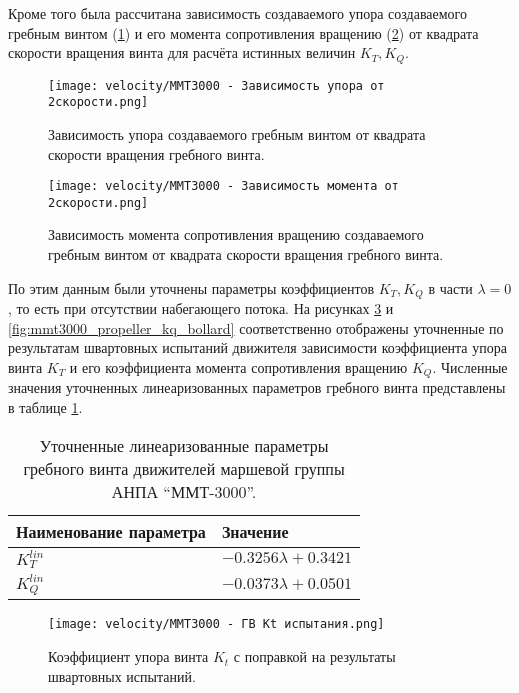 Кроме того была рассчитана зависимость создаваемого упора создаваемого гребным винтом (\ref{fig:mmt3000_thrust_rotation2}) и его момента сопротивления вращению (\ref{fig:mmt3000_torque_rotation2}) от квадрата скорости вращения винта для расчёта истинных величин $K_T,K_Q$.

\begin{figure}[ht]
    \centering
    \texttt{[image: velocity/MMT3000 - Зависимость упора от 2скорости.png]}
    \caption{Зависимость упора создаваемого гребным винтом от квадрата скорости вращения гребного винта.}
    \label{fig:mmt3000_thrust_rotation2}
\end{figure}

\begin{figure}[ht]
    \centering
    \texttt{[image: velocity/MMT3000 - Зависимость момента от 2скорости.png]}
    \caption{Зависимость момента сопротивления вращению создаваемого гребным винтом от квадрата скорости вращения гребного винта.}
    \label{fig:mmt3000_torque_rotation2}
\end{figure}

По этим данным были уточнены параметры коэффициентов $K_T, K_Q$ в части $\lambda = 0$, то есть при отсутствии набегающего потока.
На рисунках \ref{fig:mmt3000_propeller_kt_bollard} и \ref{fig:mmt3000_propeller_kq_bollard} соответственно отображены уточненные по результатам швартовных испытаний движителя зависимости коэффициента упора винта $K_T$ и его коэффициента момента сопротивления вращению $K_Q$.
Численные значения уточненных линеаризованных параметров гребного винта представлены в таблице \ref{tab:mmt3000_propeller_bollard}.

\begin{table}
    \caption{Уточненные линеаризованные параметры гребного винта движителей маршевой группы АНПА ``ММТ-3000''.}
    \label{tab:mmt3000_propeller_bollard}
    \centering
    \begin{tabular}{ll}
        \toprule
        Наименование параметра  & Значение\\
        \midrule
        $K_T^{lin}$ & $-0.3256\lambda + 0.3421$ \\
        $K_Q^{lin}$ & $-0.0373\lambda + 0.0501$ \\
        \bottomrule
    \end{tabular}
\end{table}

\begin{figure}[ht]
    \centering
    \texttt{[image: velocity/MMT3000 - ГВ Kt испытания.png]}
    \caption{Коэффициент упора винта $K_t$ с поправкой на результаты швартовных испытаний.}
    \label{fig:mmt3000_propeller_kt_bollard}
\end{figure}


